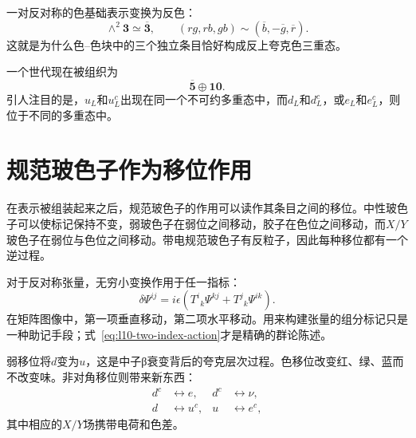 \begin{classroomqa}
\end{classroomqa}

一对反对称的色基础表示变换为反色：
\begin{equation}
\wedge^2\mathbf3\simeq\overline{\mathbf3},
\qquad
(rg,rb,gb)\sim(\overline b,-\overline g,\overline r).
\label{eq:l10-anticolor}
\end{equation}
这就是为什么色--色块中的三个独立条目恰好构成反上夸克色三重态。

一个世代现在被组织为
\begin{equation}
\overline{\mathbf5}\oplus\mathbf{10}.
\label{eq:l10-family}
\end{equation}
引人注目的是，\(u_L\)和\(u^c_L\)出现在同一个不可约多重态中，而\(d_L\)和\(d^c_L\)，或\(e_L\)和\(e^c_L\)，则位于不同的多重态中。

\begin{classroomqa}
\end{classroomqa}

\section{规范玻色子作为移位作用}

在表示被组装起来之后，规范玻色子的作用可以读作其条目之间的移位。中性玻色子可以使标记保持不变，弱玻色子在弱位之间移动，胶子在色位之间移动，而\(X/Y\)玻色子在弱位与色位之间移动。带电规范玻色子有反粒子，因此每种移位都有一个逆过程。

对于反对称张量，无穷小变换作用于任一指标：
\begin{equation}
\delta\Psi^{ij}
=
i\epsilon
\left(
T^i{}_k\Psi^{kj}
+
T^j{}_k\Psi^{ik}
\right).
\label{eq:l10-two-index-action}
\end{equation}
在矩阵图像中，第一项垂直移动，第二项水平移动。用来构建张量的组分标记只是一种助记手段；式~\eqref{eq:l10-two-index-action}才是精确的群论陈述。

弱移位将\(d\)变为\(u\)，这是中子{\proseunicodefont β}衰变背后的夸克层次过程。色移位改变红、绿、蓝而不改变味。非对角移位则带来新东西：
\begin{equation}
\begin{aligned}
d^c&\longleftrightarrow e,
& d^c&\longleftrightarrow\nu,\\
d&\longleftrightarrow u^c,
& u&\longleftrightarrow e^c,
\end{aligned}
\label{eq:l10-leptoquark-shifts}
\end{equation}
其中相应的\(X/Y\)场携带电荷和色差。

